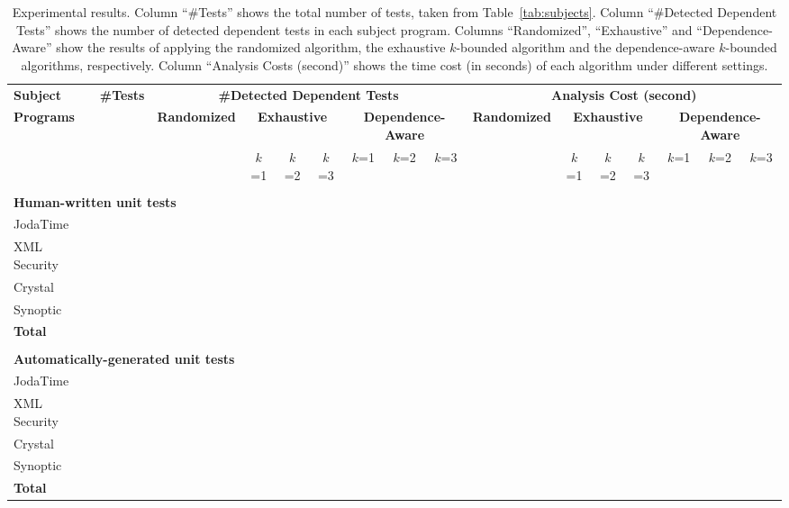 
\begin{table*}
\centering
\setlength{\tabcolsep}{0.1\tabcolsep}
\begin{tabular}{|l|c||c|c|c|c|c|c|c||c|c|c|c|c|c|c|}
\hline
\textbf{Subject} & \textbf{\#Tests} & \multicolumn{7}{|c||}{\textbf{\#Detected Dependent Tests}} & \multicolumn{7}{|c|}{\textbf{Analysis Cost (second)}}\\
\cline{3-16}
\textbf{Programs} & & \textbf{Randomized} & \multicolumn{3}{|c|}{\textbf{Exhaustive }} & \multicolumn{3}{|c||}{\textbf{Dependence-Aware}} & \textbf{Randomized} & \multicolumn{3}{|c|}{\textbf{Exhaustive }} & \multicolumn{3}{|c|}{\textbf{Dependence-Aware}} \\
& & & $k$=1 & $k$=2 & $k$=3 & $k$=1 & $k$=2 & $k$=3 &  & $k$=1 & $k$=2 & $k$=3 & $k$=1  & $k$=2 & $k$=3 \\
\hline
\multicolumn{16}{|l|}{ }\\
\multicolumn{16}{|l|}{\textbf{Human-written unit tests} }\\
\hline
JodaTime & & & && && & & & & & & & & \\
XML Security& & &&& & & & & & & & & & & \\
Crystal & & & & &&& && & & & & & & \\
Synoptic & & & & &&& && & & & & & & \\
\hline
\textbf{Total} & & &&& && & & & & & & & & \\
\hline
\multicolumn{16}{|l|}{ }\\
\multicolumn{16}{|l|}{\textbf{Automatically-generated unit tests} }\\
\hline
JodaTime & & && &&& & & & & & & & & \\
XML Security& && &&& & & & & & & & & & \\
Crystal & & & & &&&& & & & & & & & \\
Synoptic & & & & &&&& & & & & & & & \\
\hline
\textbf{Total} & &&& & && & & & & & & & & \\
\hline
\end{tabular}
\caption{Experimental results. Column ``\#Tests'' shows the total number
of tests, taken from Table~\ref{tab:subjects}. Column ``\#Detected Dependent Tests''
shows the number of detected dependent tests in each subject program.
Columns ``Randomized'', ``Exhaustive'' and ``Dependence-Aware'' show the results
of applying the randomized algorithm, the exhaustive $k$-bounded algorithm and the dependence-aware
$k$-bounded algorithms, respectively. Column ``Analysis Costs (second)''
shows the time cost (in seconds) of each algorithm under
different settings.
}
\label{tab:results}
\end{table*}
